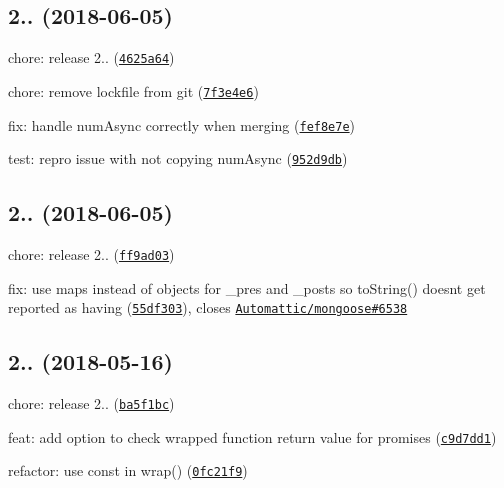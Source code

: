 \label{_2.2.1}%
 \subsection*{
\footnotesize 2.. (2018-\/06-\/05)
\normalsize }


\begin{DoxyItemize}
\item chore\+: release 2.. (\href{https://github.com/vkarpov15/kareem/commit/4625a64}{\tt 4625a64})
\item chore\+: remove lockfile from git (\href{https://github.com/vkarpov15/kareem/commit/7f3e4e6}{\tt 7f3e4e6})
\item fix\+: handle num\+Async correctly when merging (\href{https://github.com/vkarpov15/kareem/commit/fef8e7e}{\tt fef8e7e})
\item test\+: repro issue with not copying num\+Async (\href{https://github.com/vkarpov15/kareem/commit/952d9db}{\tt 952d9db})
\end{DoxyItemize}

\label{_2.2.0}%
 \subsection*{2.. (2018-\/06-\/05)}


\begin{DoxyItemize}
\item chore\+: release 2.. (\href{https://github.com/vkarpov15/kareem/commit/ff9ad03}{\tt ff9ad03})
\item fix\+: use maps instead of objects for \+\_\+pres and \+\_\+posts so {\ttfamily to\+String()} doesn\textquotesingle{}t get reported as having (\href{https://github.com/vkarpov15/kareem/commit/55df303}{\tt 55df303}), closes \href{https://github.com/Automattic/mongoose/issues/6538}{\tt Automattic/mongoose\#6538}
\end{DoxyItemize}

\label{_2.1.0}%
 \subsection*{2.. (2018-\/05-\/16)}


\begin{DoxyItemize}
\item chore\+: release 2.. (\href{https://github.com/vkarpov15/kareem/commit/ba5f1bc}{\tt ba5f1bc})
\item feat\+: add option to check wrapped function return value for promises (\href{https://github.com/vkarpov15/kareem/commit/c9d7dd1}{\tt c9d7dd1})
\item refactor\+: use const in wrap() (\href{https://github.com/vkarpov15/kareem/commit/0fc21f9}{\tt 0fc21f9})
\end{DoxyItemize}

